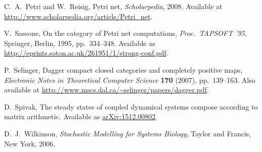 \documentclass{compositionalityarticle}
\theoremstyle{compositionality}
\theoremstyle{remark}
\begin{document}
\begin{thebibliography}{9}
C.\ A.\ Petri and W.\ Reisig, Petri net, \textsl{Scholarpedia}, 2008.  Available at
\href{http://www.scholarpedia.org/article/Petri\_net}{http://www.scholarpedia.org/article/Petri\_net}.

 V.\ Sassone, On the category of Petri net computations, \textsl{Proc.\ TAPSOFT '95}, Springer, Berlin, 1995, pp.\ 334--348. Available as \href{http://eprints.soton.ac.uk/261951/1/strong-conf.pdf}{http://eprints.soton.ac.uk/261951/1/strong-conf.pdf}.

 P.\ Selinger, Dagger compact closed categories and completely
 positive maps, \textsl{Electronic Notes in Theoretical Computer Science} \textbf{170} (2007), pp.\ 139--163.   Also available at \href{http://www.mscs.dal.ca/~selinger/papers/dagger.pdf}{http://www.mscs.dal.ca/\~{}selinger/papers/dagger.pdf}.

 D.\ Spivak, The steady states of coupled dynamical systems compose according to matrix arithmetic.  Available as \href{https://arxiv.org/abs/1512.00802}{arXiv:1512.00802}.

 D.\ J.\ Wilkinson, \textsl{Stochastic Modelling for Systems Biology},
Taylor and Francis, New York, 2006.

\end{thebibliography}
  
\end{document}
